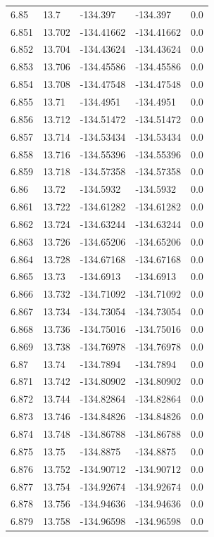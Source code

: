 \begin{tabular}{lllll}
6.85 & 13.7 & -134.397 & -134.397 & 0.0 \\
6.851 & 13.702 & -134.41662 & -134.41662 & 0.0 \\
6.852 & 13.704 & -134.43624 & -134.43624 & 0.0 \\
6.853 & 13.706 & -134.45586 & -134.45586 & 0.0 \\
6.854 & 13.708 & -134.47548 & -134.47548 & 0.0 \\
6.855 & 13.71 & -134.4951 & -134.4951 & 0.0 \\
6.856 & 13.712 & -134.51472 & -134.51472 & 0.0 \\
6.857 & 13.714 & -134.53434 & -134.53434 & 0.0 \\
6.858 & 13.716 & -134.55396 & -134.55396 & 0.0 \\
6.859 & 13.718 & -134.57358 & -134.57358 & 0.0 \\
6.86 & 13.72 & -134.5932 & -134.5932 & 0.0 \\
6.861 & 13.722 & -134.61282 & -134.61282 & 0.0 \\
6.862 & 13.724 & -134.63244 & -134.63244 & 0.0 \\
6.863 & 13.726 & -134.65206 & -134.65206 & 0.0 \\
6.864 & 13.728 & -134.67168 & -134.67168 & 0.0 \\
6.865 & 13.73 & -134.6913 & -134.6913 & 0.0 \\
6.866 & 13.732 & -134.71092 & -134.71092 & 0.0 \\
6.867 & 13.734 & -134.73054 & -134.73054 & 0.0 \\
6.868 & 13.736 & -134.75016 & -134.75016 & 0.0 \\
6.869 & 13.738 & -134.76978 & -134.76978 & 0.0 \\
6.87 & 13.74 & -134.7894 & -134.7894 & 0.0 \\
6.871 & 13.742 & -134.80902 & -134.80902 & 0.0 \\
6.872 & 13.744 & -134.82864 & -134.82864 & 0.0 \\
6.873 & 13.746 & -134.84826 & -134.84826 & 0.0 \\
6.874 & 13.748 & -134.86788 & -134.86788 & 0.0 \\
6.875 & 13.75 & -134.8875 & -134.8875 & 0.0 \\
6.876 & 13.752 & -134.90712 & -134.90712 & 0.0 \\
6.877 & 13.754 & -134.92674 & -134.92674 & 0.0 \\
6.878 & 13.756 & -134.94636 & -134.94636 & 0.0 \\
6.879 & 13.758 & -134.96598 & -134.96598 & 0.0 \\

\end{tabular}
